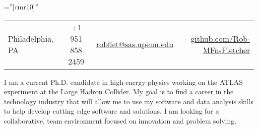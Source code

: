 \documentclass[a4paper,10pt]{article} %
\begin{document}
\pagestyle{empty} %

\font\fb=''[cmr10]'' %


\par{\bigskip\par} %
\begin{centering}
\begin{tabular}{ l | c | c | r}
Philadelphia, PA   &  +1 951 858 2459   &   \href{mailto:robflet@sas.upenn.edu}{robflet@sas.upenn.edu} & \href{github.com/Rob-MFn-Fletcher}{github.com/Rob-MFn-Fletcher}
\end{tabular} \par
\end{centering}

\vspace{5mm}
I am a current Ph.D. candidate in high energy physics working on the ATLAS experiment at the Large Hadron
Collider. My goal is to find a career in the technology industry that will allow me to use my software
and data analysis skills to help develop cutting edge software and solutions. I am looking for a collaborative,
team environment focused on innovation and problem solving.
\vspace{3mm}





\end{document}
